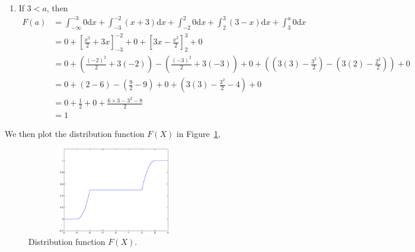 \documentclass[11pt]{article} %
\begin{document}
\begin{enumerate}
\item If $3 < a$, then
\begin{align*}
F(a) & = \int_{-\infty}^{-3} 0 \text{d} x + \int_{-3}^{-2} (x+3) \text{d} x + \int_{-2}^{2} 0 \text{d} x + \int_{2}^3 (3-x) \text{d} x + \int_{3}^a 0 \text{d} x \\
& = 0 + \left[ \frac{x^2}{2} + 3x\right]_{-3}^{-2} + 0 + \left[3x - \frac{x^2}{2} \right]_{2}^3 + 0 \\
& = 0 + \left( \frac{(-2)^2}{2} + 3(-2)\right) - \left( \frac{(-3)^2}{2} + 3(-3) \right) + 0 + \left( \left(3(3)-\frac{3^2}{2} \right) - \left( 3(2) - \frac{2^2}{2}\right) \right) + 0 \\
& = 0 + (2-6) - (\frac{9}{2} - 9) + 0 + \left( 3(3) - \frac{3^2}{2} -4 \right)  + 0\\
& = 0 + \frac{1}{2} + 0 + \frac{6\times 3 - 3^2 -8}{2} \\
& = 1
\end{align*}
\end{enumerate}
We then plot the distribution function $F(X)$ in Figure~\ref{Fig:ch0505b}, 
\begin{figure}[h!]
\centering
\includegraphics[width=3in, height=1.5in]{ch0505b.eps}
\caption{Distribution function $F(X)$.}
\label{Fig:ch0505b}
\end{figure}
\end{document}
